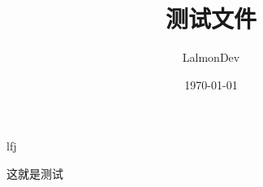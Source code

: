 \documentclass{article}
\title{\heiti 测试文件}
\author{\kaishu LalmonDev}
\date{\today}
\begin{document}
\maketitle
lfj 


这就是测试
\end{document}
